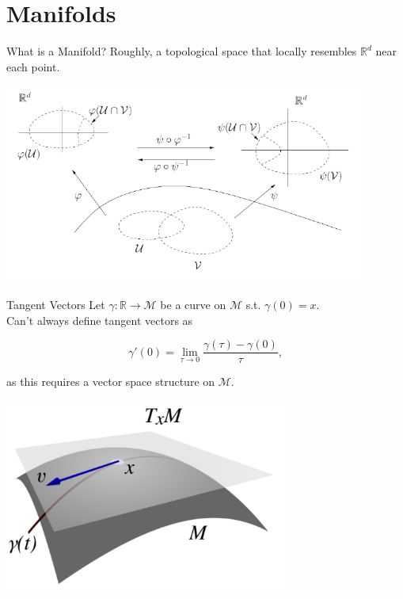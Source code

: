 \documentclass[xcolor=dvipsnames,t]{beamer} %
\newcommand{\reals}{\mathbb{R}}
\begin{document}
\section{Manifolds}
\begin{frame}{What is a Manifold?}
   Roughly, a topological space that locally resembles $\reals^d$ near each point.\\[0.5em]
   
   \begin{center}
      \includegraphics[width=0.9\textwidth]{figures/charts.pdf}
   \end{center}
\end{frame}


\begin{frame}{Tangent Vectors}
   Let $\gamma:\reals\to\mathcal{M}$ be a curve on $\mathcal{M}$ s.t. $\gamma(0)=x$.\\[.5em]
   Can't always define tangent vectors as 

   \[ \gamma'(0) = \lim_{\tau\to 0} \dfrac{\gamma(\tau)-\gamma(0)}{\tau}, \] 
   
   \noindent as this requires a vector space structure on $\mathcal{M}$.
    
   \begin{center}
      \includegraphics[width=0.7\textwidth]{figures/tangent_space.pdf}
   \end{center}
\end{frame}
\end{document}
